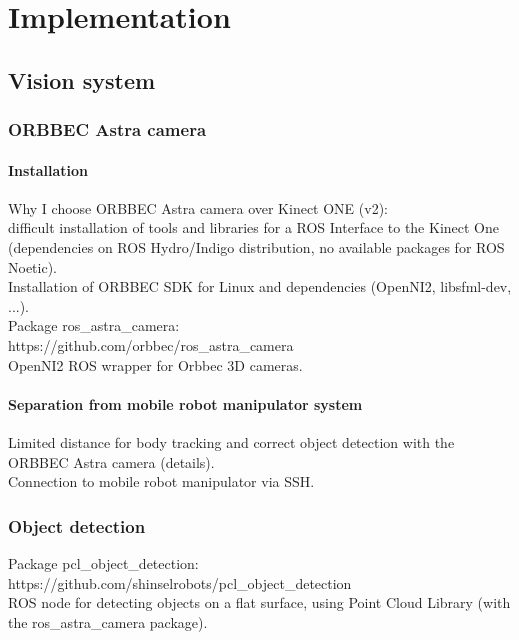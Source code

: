 \chapter{Implementation}

\section{Vision system}
\subsection{ORBBEC Astra camera}

\subsubsection{Installation}
Why I choose ORBBEC Astra camera over Kinect ONE (v2):\\
difficult installation of tools and libraries for a ROS Interface to the Kinect One (dependencies on ROS Hydro/Indigo distribution, no available packages for ROS Noetic).\\

Installation of ORBBEC SDK for Linux and dependencies (OpenNI2, libsfml-dev, ...).\\

 Package ros\_astra\_camera:\\
 https://github.com/orbbec/ros\_astra\_camera\\
 OpenNI2 ROS wrapper for Orbbec 3D cameras.\\

\subsubsection{Separation from mobile robot manipulator system}

Limited distance for body tracking and correct object detection with the ORBBEC Astra camera (details).\\

Connection to mobile robot manipulator via SSH.\\

\subsection{Object detection}
Package pcl\_object\_detection:\\
https://github.com/shinselrobots/pcl\_object\_detection\\
ROS node for detecting objects on a flat surface, using Point Cloud Library (with the ros\_astra\_camera package).\\


